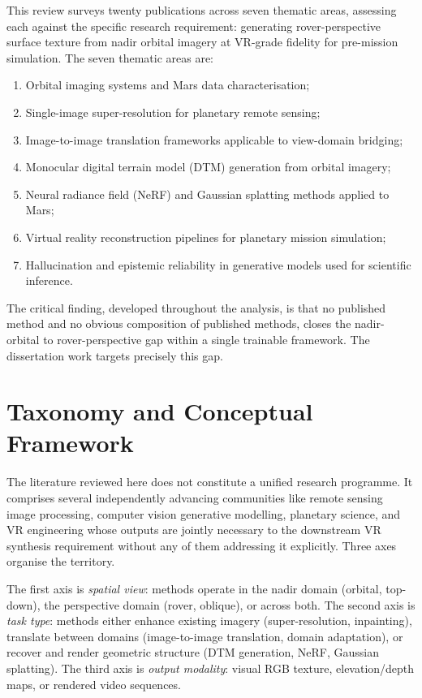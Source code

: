 \documentclass[10pt,journal]{IEEEtran}
\begin{document}
This review surveys twenty publications across seven thematic areas, assessing
each against the specific research requirement: generating rover-perspective
surface texture from nadir orbital imagery at VR-grade fidelity for pre-mission
simulation. The seven thematic areas are:
\begin{enumerate}
  \item Orbital imaging systems and Mars data characterisation;
  \item Single-image super-resolution for planetary remote sensing;
  \item Image-to-image translation frameworks applicable to view-domain bridging;
  \item Monocular digital terrain model (DTM) generation from orbital imagery;
  \item Neural radiance field (NeRF) and Gaussian splatting methods applied to
        Mars;
  \item Virtual reality reconstruction pipelines for planetary mission
        simulation;
  \item Hallucination and epistemic reliability in generative models used for
        scientific inference.
\end{enumerate}
The critical finding, developed throughout the analysis, is that no published
method and no obvious composition of published methods, closes the
nadir-orbital to rover-perspective gap within a single trainable framework.
The dissertation work targets precisely this gap.

\section{Taxonomy and Conceptual Framework}
\label{sec:taxonomy}

The literature reviewed here does not constitute a unified research programme.
It comprises several independently advancing communities like remote sensing image
processing, computer vision generative modelling, planetary science, and VR
engineering whose outputs are jointly necessary to the downstream VR synthesis
requirement without any of them addressing it explicitly. Three axes organise the
territory.

The first axis is \textit{spatial view}: methods operate in the nadir domain
(orbital, top-down), the perspective domain (rover, oblique), or across both.
The second axis is \textit{task type}: methods either enhance existing imagery
(super-resolution, inpainting), translate between domains (image-to-image
translation, domain adaptation), or recover and render geometric structure (DTM
generation, NeRF, Gaussian splatting). The third axis is \textit{output
modality}: visual RGB texture, elevation/depth maps, or rendered video sequences.
\end{document}
